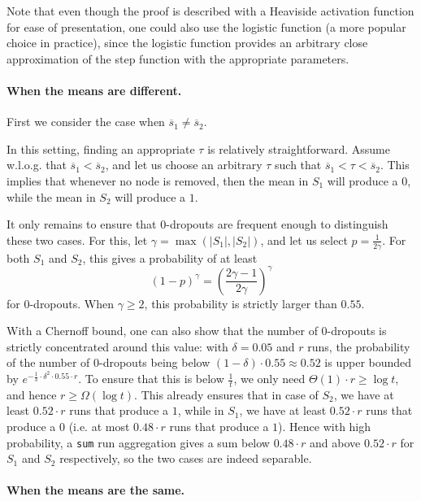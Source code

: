 \documentclass{article}
\begin{document}
Note that even though the proof is described with a Heaviside activation function for ease of presentation, one could also use the logistic function (a more popular choice in practice), since the logistic function provides an arbitrary close approximation of the step function with the appropriate parameters.

\paragraph{When the means are different.}

First we consider the case when $\overline{s}_{1} \neq \overline{s}_{2}$.

In this setting, finding an appropriate $\tau$ is relatively straightforward. Assume w.l.o.g. that $\overline{s}_{1} < \overline{s}_{2}$, and let us choose an arbitrary $\tau$ such that $\overline{s}_{1} < \tau < \overline{s}_{2}$. This implies that whenever no node is removed, then the mean in $S_1$ will produce a $0$, while the mean in $S_2$ will produce a $1$.

It only remains to ensure that $0$-dropouts are frequent enough to distinguish these two cases. For this, let $\gamma = \max(|S_1|, |S_2|)$, and let us select $p=\frac{1}{2 \gamma}$. For both $S_1$ and $S_2$, this gives a probability of at least
\[ (1-p)^{\gamma} = \left( \frac{2 \gamma -1}{2 \gamma} \right)^{\gamma} \]
for $0$-dropouts. When $\gamma \geq 2$, this probability is strictly larger than $0.55$.

With a Chernoff bound, one can also show that the number of $0$-dropouts is strictly concentrated around this value: with $\delta=0.05$ and $r$ runs, the probability of the number of $0$-dropouts being below $(1-\delta) \cdot 0.55 \approx 0.52$ is upper bounded by $e^{-\frac{1}{3}\cdot \delta^2 \cdot 0.55 \cdot r}$. To ensure that this is below $\frac{1}{t}$, we only need $\Theta(1) \cdot r \geq \log t$, and hence $r \geq \Omega(\log t)$. This already ensures that in case of $S_2$, we have at least $0.52 \cdot r$ runs that produce a $1$, while in $S_1$, we have at least $0.52 \cdot r$ runs that produce a $0$ (i.e. at most $0.48 \cdot r$ runs that produce a $1$). Hence with high probability, a \texttt{sum} run aggregation gives a sum below $0.48 \cdot r$ and above $0.52 \cdot r$ for $S_1$ and $S_2$ respectively, so the two cases are indeed separable.

\paragraph{When the means are the same.}
\end{document}
